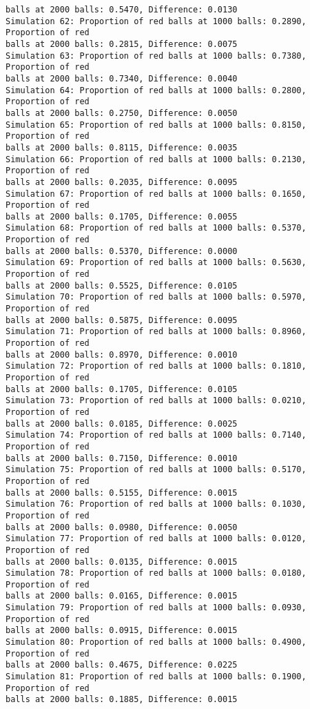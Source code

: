 \documentclass[11pt]{article}
\begin{document}
\begin{Verbatim}[commandchars=\\\{\}]
balls at 2000 balls: 0.5470, Difference: 0.0130
Simulation 62: Proportion of red balls at 1000 balls: 0.2890, Proportion of red
balls at 2000 balls: 0.2815, Difference: 0.0075
Simulation 63: Proportion of red balls at 1000 balls: 0.7380, Proportion of red
balls at 2000 balls: 0.7340, Difference: 0.0040
Simulation 64: Proportion of red balls at 1000 balls: 0.2800, Proportion of red
balls at 2000 balls: 0.2750, Difference: 0.0050
Simulation 65: Proportion of red balls at 1000 balls: 0.8150, Proportion of red
balls at 2000 balls: 0.8115, Difference: 0.0035
Simulation 66: Proportion of red balls at 1000 balls: 0.2130, Proportion of red
balls at 2000 balls: 0.2035, Difference: 0.0095
Simulation 67: Proportion of red balls at 1000 balls: 0.1650, Proportion of red
balls at 2000 balls: 0.1705, Difference: 0.0055
Simulation 68: Proportion of red balls at 1000 balls: 0.5370, Proportion of red
balls at 2000 balls: 0.5370, Difference: 0.0000
Simulation 69: Proportion of red balls at 1000 balls: 0.5630, Proportion of red
balls at 2000 balls: 0.5525, Difference: 0.0105
Simulation 70: Proportion of red balls at 1000 balls: 0.5970, Proportion of red
balls at 2000 balls: 0.5875, Difference: 0.0095
Simulation 71: Proportion of red balls at 1000 balls: 0.8960, Proportion of red
balls at 2000 balls: 0.8970, Difference: 0.0010
Simulation 72: Proportion of red balls at 1000 balls: 0.1810, Proportion of red
balls at 2000 balls: 0.1705, Difference: 0.0105
Simulation 73: Proportion of red balls at 1000 balls: 0.0210, Proportion of red
balls at 2000 balls: 0.0185, Difference: 0.0025
Simulation 74: Proportion of red balls at 1000 balls: 0.7140, Proportion of red
balls at 2000 balls: 0.7150, Difference: 0.0010
Simulation 75: Proportion of red balls at 1000 balls: 0.5170, Proportion of red
balls at 2000 balls: 0.5155, Difference: 0.0015
Simulation 76: Proportion of red balls at 1000 balls: 0.1030, Proportion of red
balls at 2000 balls: 0.0980, Difference: 0.0050
Simulation 77: Proportion of red balls at 1000 balls: 0.0120, Proportion of red
balls at 2000 balls: 0.0135, Difference: 0.0015
Simulation 78: Proportion of red balls at 1000 balls: 0.0180, Proportion of red
balls at 2000 balls: 0.0165, Difference: 0.0015
Simulation 79: Proportion of red balls at 1000 balls: 0.0930, Proportion of red
balls at 2000 balls: 0.0915, Difference: 0.0015
Simulation 80: Proportion of red balls at 1000 balls: 0.4900, Proportion of red
balls at 2000 balls: 0.4675, Difference: 0.0225
Simulation 81: Proportion of red balls at 1000 balls: 0.1900, Proportion of red
balls at 2000 balls: 0.1885, Difference: 0.0015

\end{Verbatim}
\end{document}
